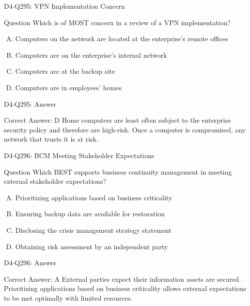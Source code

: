 \documentclass{beamer}
\begin{document}
	\begin{frame}{D4-Q295: VPN Implementation Concern}
		\begin{block}{Question}
			Which is of MOST concern in a review of a VPN implementation?
		\end{block}
		\begin{enumerate}[(A)]
			\item Computers on the network are located at the enterprise's remote offices
			\item Computers are on the enterprise's internal network
			\item Computers are at the backup site
			\item Computers are in employees' homes
		\end{enumerate}
	\end{frame}
	\begin{frame}{D4-Q295: Answer}
		\begin{block}{Correct Answer: D}
			Home computers are least often subject to the enterprise security policy and therefore are high-risk. Once a computer is compromised, any network that trusts it is at risk.
		\end{block}
	\end{frame}
	
	\begin{frame}{D4-Q296: BCM Meeting Stakeholder Expectations}
		\begin{block}{Question}
			Which BEST supports business continuity management in meeting external stakeholder expectations?
		\end{block}
		\begin{enumerate}[(A)]
			\item Prioritizing applications based on business criticality
			\item Ensuring backup data are available for restoration
			\item Disclosing the crisis management strategy statement
			\item Obtaining risk assessment by an independent party
		\end{enumerate}
	\end{frame}
	\begin{frame}{D4-Q296: Answer}
		\begin{block}{Correct Answer: A}
			External parties expect their information assets are secured. Prioritizing applications based on business criticality allows external expectations to be met optimally with limited resources.
		\end{block}
	\end{frame}
	
\end{document}
